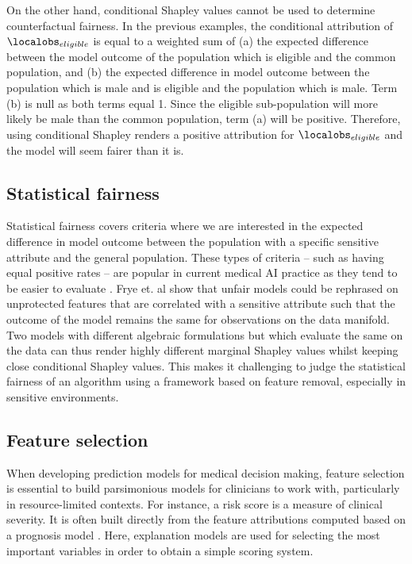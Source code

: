 \documentclass[nohyperref]{article}
\theoremstyle{plain}
\theoremstyle{definition}
\theoremstyle{remark}
\begin{document}
On the other hand, conditional Shapley values cannot be used to determine counterfactual fairness. In the previous examples, the conditional attribution of $\localobs_{eligible}$ is equal to a weighted sum of (a) the expected difference between the model outcome of the population which is eligible and the common population, and (b) the expected difference in model outcome between the population which is male and is eligible and the population which is male. Term (b) is null as both terms equal 1. Since the eligible sub-population will more likely be male than the common population, term (a) will be positive. Therefore, using conditional Shapley renders a positive attribution for $\localobs_{eligible}$ and the model will seem fairer than it is.

\subsection{Statistical fairness}

Statistical fairness covers criteria where we are interested in the expected difference in model outcome between the population with a specific sensitive attribute and the general population. These types of criteria -- such as having equal positive rates -- are popular in current medical AI practice as they tend to be easier to evaluate \cite{hedden2021statistical}. Frye et. al  show that unfair models could be rephrased on unprotected features that are correlated with a sensitive attribute such that the outcome of the model remains the same for observations on the data manifold. Two models with different algebraic formulations but which evaluate the same on the data can thus render highly different marginal Shapley values whilst keeping close conditional Shapley values. This makes it challenging to judge the statistical fairness of an algorithm using a framework based on feature removal, especially in sensitive environments.


\subsection{Feature selection}
When developing prediction models for medical decision making, feature selection is essential to build parsimonious models for clinicians to work with, particularly in resource-limited contexts. For instance, a risk score is a measure of clinical severity. It is often built directly from the feature attributions computed based on a prognosis model \cite{olson2013development, bernabe2016development}. Here, explanation models are used for selecting the most important variables in order to obtain a simple scoring system. 
\end{document}
